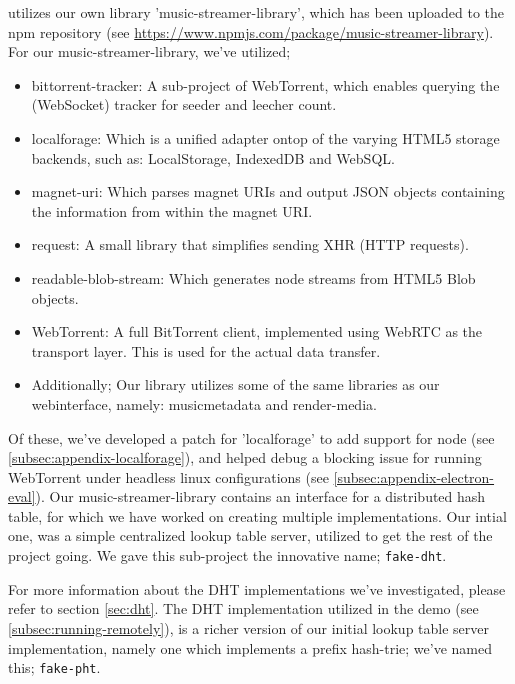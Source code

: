 utilizes our own library 'music-streamer-library', which has been uploaded to
the npm repository (see \url{https://www.npmjs.com/package/music-streamer-library}).
\newline\newline
For our music-streamer-library, we've utilized;
\begin{itemize}
\item bittorrent-tracker: A sub-project of WebTorrent, which enables querying 
        the (WebSocket) tracker for seeder and leecher count.
\item localforage: Which is a unified adapter ontop of the varying HTML5
        storage backends, such as: LocalStorage, IndexedDB and WebSQL.
\item magnet-uri: Which parses magnet URIs and output JSON objects containing
        the information from within the magnet URI.
\item request: A small library that simplifies sending XHR (HTTP requests).
\item readable-blob-stream: Which generates node streams from HTML5 Blob objects.
\item WebTorrent: A full BitTorrent client, implemented using WebRTC as the 
        transport layer. This is used for the actual data transfer.
\item Additionally; Our library utilizes some of the same libraries as our
        webinterface, namely: musicmetadata and render-media.
\end{itemize}
Of these, we've developed a patch for 'localforage' to add support for node
(see \ref{subsec:appendix-localforage}), and helped debug a blocking issue for
running WebTorrent under headless linux configurations (see
\ref{subsec:appendix-electron-eval}).
\newline\newline
Our music-streamer-library contains an interface for a distributed hash table,
for which we have worked on creating multiple implementations. Our intial one,
was a simple centralized lookup table server, utilized to get the rest of the 
project going. We gave this sub-project the innovative name; \verb|fake-dht|.

For more information about the DHT implementations we've investigated, please
refer to section \ref{sec:dht}.
\newline\newline
The DHT implementation utilized in the demo (see \ref{subsec:running-remotely}),
is a richer version of our initial lookup table server implementation, namely
one which implements a prefix hash-trie; we've named this; \verb|fake-pht|.

